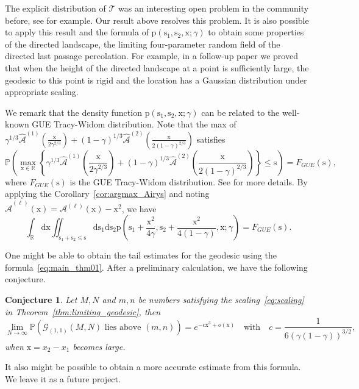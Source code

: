 \documentclass{article}
\newtheorem{conj}[thm]{Conjecture}
\numberwithin{equation}{section}
\newcommand{\gd}{{\mathcal{G}}}
\newcommand{\limp}{\mathrm{p}}
\newcommand{\prob}{\mathbb{P}}
\newcommand{\realR}{\mathbb{R}}
\begin{document}
The explicit distribution of $\mathcal{T}$ was an interesting open problem in the community before, see \cite[Problem 14.4(a)]{Dauvergne-Ortmann-Virag18} for example. Our result above resolves this problem. It is also possible to apply this result and the formula of $\limp(\mathrm{s}_1,\mathrm{s}_2,\mathrm{x};\gamma)$ to obtain some properties of the directed landscape, the limiting four-parameter random field of the directed last passage percolation. For example, in a follow-up paper \cite{Liu21} we proved that when the height of the directed landscape at a point is sufficiently large, the geodesic to this point is rigid and the location has a Gaussian distribution under appropriate scaling. 


We remark that the density function $\limp(\mathrm{s}_1,\mathrm{s}_2,\mathrm{x};\gamma)$ can be related to the well-known GUE Tracy-Widom distribution. Note that the max of $\gamma^{1/3}\mathcal{\hat A}^{(1)}\left(\frac{\mathrm{x}}{2\gamma^{2/3}}\right)+(1-\gamma)^{1/3}\mathcal{\hat A}^{(2)}\left(\frac{\mathrm{x}}{2(1-\gamma)^{2/3}}\right)$ satisfies 
\begin{equation*}
	\prob\left(\max_{\mathrm{x}\in\realR} \left\{\gamma^{1/3}\mathcal{\hat A}^{(1)}\left(\frac{\mathrm{x}}{2\gamma^{2/3}}\right)+(1-\gamma)^{1/3}\mathcal{\hat A}^{(2)}\left(\frac{\mathrm{x}}{2(1-\gamma)^{2/3}}\right)\right\}\le \mathrm{s}\right) = F_{GUE}(\mathrm{s}),
\end{equation*}
where $F_{GUE}(\mathrm{s})$ is the GUE Tracy-Widom distribution. See \cite{Baik-Liu14,Baik-Liu13} for more details. By applying the Corollary~\ref{cor:argmax_Airys} and noting $\mathcal{\hat A}^{(\ell)}(\mathrm{x})=\mathcal{A}^{(\ell)}(\mathrm{x})-\mathrm{x}^2$, we have 
\begin{equation}\int_\realR\mathrm{d}\mathrm{x} \iint_{\mathrm{s}_1+\mathrm{s_2}\le\mathrm{s}}\mathrm{ds_1ds_2} \limp\left(\mathrm{s}_1+\frac{\mathrm{x}^2}{4\gamma},\mathrm{s}_2+\frac{\mathrm{x}^2}{4(1-\gamma)},\mathrm{x};\gamma\right) =F_{GUE}(\mathrm{s}).
	\end{equation}


\bigskip

One might be able to obtain the tail estimates for the geodesic using the formula~\eqref{eq:main_thm01}.  After a preliminary calculation, we have the following conjecture.
\begin{conj}
	Let $M,N$ and $m,n$ be numbers satisfying the scaling~\eqref{eq:scaling} in Theorem~\ref{thm:limiting_geodesic}, then
	\begin{equation}
		\lim_{N\to\infty}\prob\left(\gd_{(1,1)}(M,N) \text{ lies above } (m,n)\right) = e^{-c\mathrm{x}^3+o(\mathrm{x})} \quad \text{with}\quad c=\frac1{6(\gamma(1-\gamma))^{3/2}},
	\end{equation}
	when $\mathrm{x}=x_2-x_1$ becomes large.
\end{conj}
It also might be possible to obtain a more accurate estimate from this formula. We leave it as a future project.
\end{document}
